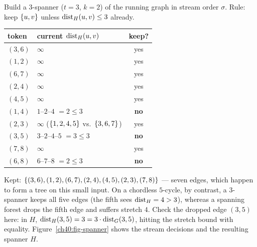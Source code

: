 \begin{labbox}
Build a $3$-spanner ($t=3$, $k=2$) of the running graph in stream order
$\sigma$. Rule: keep $\{u,v\}$ unless $\operatorname{dist}_H(u,v)\le 3$ already.

\begin{center}
\begin{tabular}{llc}
\toprule
token & current $\operatorname{dist}_H(u,v)$ & keep? \\
\midrule
$(3,6)$ & $\infty$ & yes \\
$(1,2)$ & $\infty$ & yes \\
$(6,7)$ & $\infty$ & yes \\
$(2,4)$ & $\infty$ & yes \\
$(4,5)$ & $\infty$ & yes \\
$(1,4)$ & $1$--$2$--$4$ $=2\le3$ & \textbf{no} \\
$(2,3)$ & $\infty$ ($\{1,2,4,5\}$ vs.\ $\{3,6,7\}$) & yes \\
$(3,5)$ & $3$--$2$--$4$--$5$ $=3\le3$ & \textbf{no} \\
$(7,8)$ & $\infty$ & yes \\
$(6,8)$ & $6$--$7$--$8$ $=2\le3$ & \textbf{no} \\
\bottomrule
\end{tabular}
\end{center}

Kept: $\{(3,6),(1,2),(6,7),(2,4),(4,5),(2,3),(7,8)\}$ --- seven edges, which
happen to form a tree on this small input. On a chordless $5$-cycle, by
contrast, a $3$-spanner keeps all five edges (the fifth sees $\operatorname{dist}_H = 4 > 3$),
whereas a spanning forest drops the fifth edge and suffers stretch $4$. Check
the dropped edge $(3,5)$ here: in $H$, $\operatorname{dist}_H(3,5)=3=3\cdot\operatorname{dist}_G(3,5)$,
hitting the stretch bound with equality. Figure~\ref{ch40:fig-spanner} shows the
stream decisions and the resulting spanner $H$.
\end{labbox}

